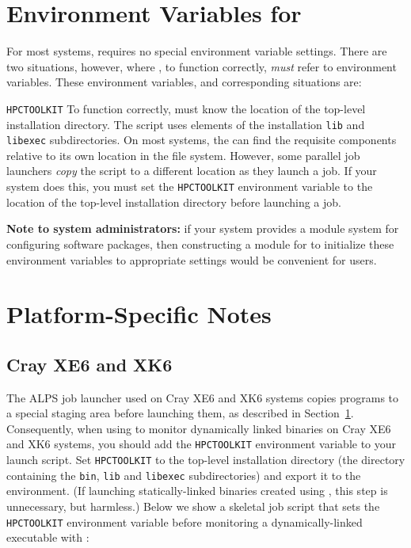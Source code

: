 \section{Environment Variables for \hpcrun{}}
\label{sec:env-vars}
For most systems, \hpcrun{} requires no special environment variable settings.
There are two situations, however, where \hpcrun{}, to function correctly,
\emph{must} refer to environment variables. These environment variables, and
corresponding situations are:
\begin{description}
  \item{\verb|HPCTOOLKIT|} To function correctly, \hpcrun{} must know
       the location of the \HPCToolkit{} top-level installation directory.
       The \hpcrun{} script uses elements of the installation \verb|lib| and
       \verb|libexec| subdirectories. On most systems, the 
       \hpcrun{} can find the requisite
       components relative to its own location in the file system. 
       However, some parallel job launchers \emph{copy} the
       \hpcrun{} script to a different location as they launch a job. If your
       system does this, you must set the \verb|HPCTOOLKIT|
       environment variable to the location of the \HPCToolkit{} top-level installation directory 
       before launching a job.
\end{description}

{\bf Note to system administrators:} if your system provides a module system for configuring 
software packages, then constructing
a module for \HPCToolkit{} to initialize these environment variables to appropriate settings
would be convenient for users.

\section{Platform-Specific Notes}

%
%
\subsection{Cray XE6 and XK6}

The ALPS job launcher used on Cray XE6 and XK6 systems copies 
programs to a special staging area before launching them,
as described in Section~\ref{sec:env-vars}.
Consequently, when using \hpcrun{} to monitor dynamically linked binaries on Cray XE6 and XK6 systems, you
should add the \verb|HPCTOOLKIT| environment variable to your launch
script.  
Set \verb|HPCTOOLKIT| to the top-level \HPCToolkit{} installation directory
(the directory containing the \verb|bin|, \verb|lib| and
\verb|libexec| subdirectories) and export it to the environment.  
(If launching statically-linked binaries created using \hpclink{}, this step is unnecessary, but harmless.)
Below we show a skeletal job script that sets the \verb|HPCTOOLKIT| environment variable  before monitoring 
a dynamically-linked executable with \hpcrun{}: 


